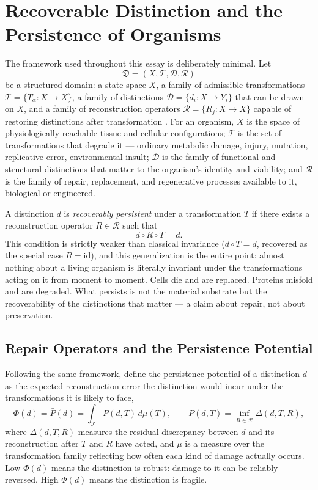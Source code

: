 \documentclass[12pt]{article}
\begin{document}
\label{sec:intro}

\section{Recoverable Distinction and the Persistence of Organisms}
\label{sec:persistence}

The framework used throughout this essay is deliberately minimal. Let
\[
\mathfrak{D} = (X, \mathcal{T}, \mathcal{D}, \mathcal{R})
\]
be a structured domain: a state space $X$, a family of admissible transformations $\mathcal{T} = \{T_\alpha : X \to X\}$, a family of distinctions $\mathcal{D} = \{d_i : X \to Y_i\}$ that can be drawn on $X$, and a family of reconstruction operators $\mathcal{R} = \{R_j : X \to X\}$ capable of restoring distinctions after transformation \cite{flyxion2026persistence}. For an organism, $X$ is the space of physiologically reachable tissue and cellular configurations; $\mathcal{T}$ is the set of transformations that degrade it --- ordinary metabolic damage, injury, mutation, replicative error, environmental insult; $\mathcal{D}$ is the family of functional and structural distinctions that matter to the organism's identity and viability; and $\mathcal{R}$ is the family of repair, replacement, and regenerative processes available to it, biological or engineered.

A distinction $d$ is \emph{recoverably persistent} under a transformation $T$ if there exists a reconstruction operator $R \in \mathcal{R}$ such that
\begin{equation}
d \circ R \circ T = d.
\label{eq:recoverable-persistence}
\end{equation}
This condition is strictly weaker than classical invariance ($d \circ T = d$, recovered as the special case $R = \mathrm{id}$), and this generalization is the entire point: almost nothing about a living organism is literally invariant under the transformations acting on it from moment to moment. Cells die and are replaced. Proteins misfold and are degraded. What persists is not the material substrate but the recoverability of the distinctions that matter --- a claim about repair, not about preservation.

\subsection{Repair Operators and the Persistence Potential}

Following the same framework, define the persistence potential of a distinction $d$ as the expected reconstruction error the distinction would incur under the transformations it is likely to face,
\begin{equation}
\Phi(d) = \bar{P}(d) = \int_{\mathcal{T}} P(d,T)\, d\mu(T), \qquad P(d,T) = \inf_{R \in \mathcal{R}} \Delta(d,T,R),
\label{eq:persistence-potential}
\end{equation}
where $\Delta(d,T,R)$ measures the residual discrepancy between $d$ and its reconstruction after $T$ and $R$ have acted, and $\mu$ is a measure over the transformation family reflecting how often each kind of damage actually occurs. Low $\Phi(d)$ means the distinction is robust: damage to it can be reliably reversed. High $\Phi(d)$ means the distinction is fragile.
\end{document}
